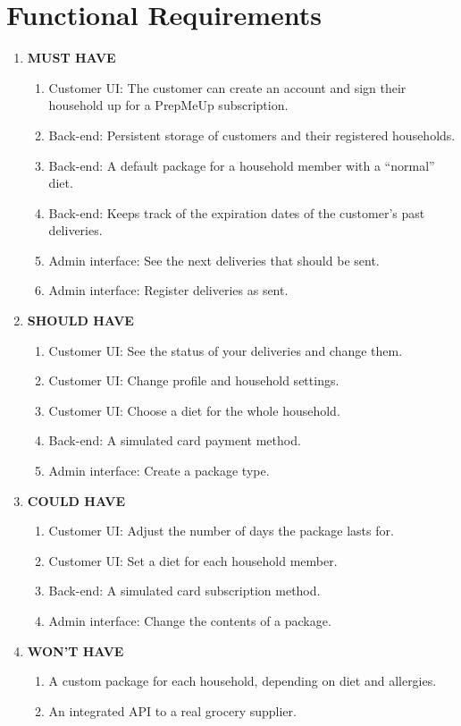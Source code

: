 \documentclass[a4paper,11pt]{article}
\begin{document}
\section{Functional Requirements}
\begin{enumerate}
    \item \textbf{MUST HAVE}
    \begin{enumerate}
        \item Customer UI: The customer can create an account and sign their household up for a PrepMeUp subscription.
        \item Back-end: Persistent storage of customers and their registered households.
        \item Back-end: A default package for a household member with a ``normal'' diet.
        \item Back-end: Keeps track of the expiration dates of the customer's past deliveries.
        \item Admin interface: See the next deliveries that should be sent.
        \item Admin interface: Register deliveries as sent.
    \end{enumerate}

    \item \textbf{SHOULD HAVE}
    \begin{enumerate}
        \item Customer UI: See the status of your deliveries and change them.
        \item Customer UI: Change profile and household settings.
        \item Customer UI: Choose a diet for the whole household.
        \item Back-end: A simulated card payment method.
        \item Admin interface: Create a package type.
    \end{enumerate}

    \item \textbf{COULD HAVE}
    \begin{enumerate}
        \item Customer UI: Adjust the number of days the package lasts for.
        \item Customer UI: Set a diet for each household member.
        \item Back-end: A simulated card subscription method.
        \item Admin interface: Change the contents of a package.
    \end{enumerate}

    \item \textbf{WON'T HAVE}
    \begin{enumerate}
        \item A custom package for each household, depending on diet and allergies.
        \item An integrated API to a real grocery supplier.
    \end{enumerate}
\end{enumerate}
\end{document}
